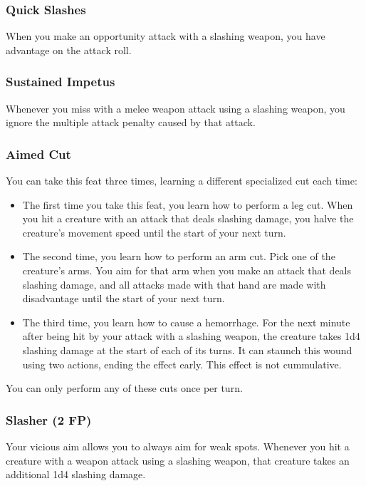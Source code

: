 \subsubsection{Quick Slashes} \label{feat::quickslashes}
    When you make an opportunity attack with a slashing weapon, you have advantage on the attack roll.
\subsubsection{Sustained Impetus} \label{feat::sustainedimpetus}
    Whenever you miss with a melee weapon attack using a slashing weapon, you ignore the multiple attack penalty caused by that attack.
\subsubsection{Aimed Cut} \label{feat::aimedcut}
    You can take this feat three times, learning a different specialized cut each time:
    \begin{itemize}
        \item The first time you take this feat, you learn how to perform a leg cut.
        When you hit a creature with an attack that deals slashing damage, you halve the creature's movement speed until the start of your next turn.
        \item The second time, you learn how to perform an arm cut.
        Pick one of the creature's arms.
        You aim for that arm when you make an attack that deals slashing damage, and all attacks made with that hand are made with disadvantage until the start of your next turn.
        \item The third time, you learn how to cause a hemorrhage.
        For the next minute after being hit by your attack with a slashing weapon, the creature takes 1d4 slashing damage at the start of each of its turns.
        It can staunch this wound using two actions, ending the effect early.
        This effect is not cummulative.
    \end{itemize}

    You can only perform any of these cuts once per turn.
\subsubsection{Slasher (2 FP)} \label{feat::slasher}
    Your vicious aim allows you to always aim for weak spots.
    Whenever you hit a creature with a weapon attack using a slashing weapon, that creature takes an additional 1d4 slashing damage.

